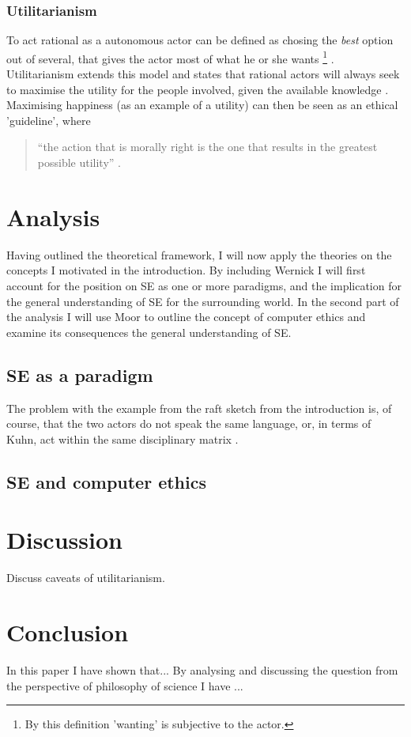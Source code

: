 \documentclass{article}
\begin{document}
\subsubsection{Utilitarianism}
To act rational as a autonomous actor can be defined as chosing the \textit{best} option out of several, that gives the actor most of what he or she wants \footnote{By this definition 'wanting' is subjective to the actor.} \citep[p. 232]{Gilje:2007}. Utilitarianism extends this model and states that rational actors will always seek to maximise the utility for the people involved, given the available knowledge \citep[p. 232]{Holm:2014, Gilje:2007}. Maximising happiness (as an example of a utility) can then be seen as an ethical 'guideline', where
\begin{quote}
``the action that is morally right is the one that results in the greatest possible utility'' \citep[p. 207]{Holm:2014}.
\end{quote}


\section{Analysis}
Having outlined the theoretical framework, I will now apply the theories on the concepts I motivated in the introduction. By including Wernick I will first account for the position on SE as one or more paradigms, and the implication for the general understanding of SE for the surrounding world.
In the second part of the analysis I will use Moor to outline the concept of computer ethics and examine its consequences the general understanding of SE.

\subsection{SE as a paradigm}
The problem with the example from the raft sketch from the introduction is, of course, that the two actors do not speak the same language, or, in terms of Kuhn, act within the same disciplinary matrix \citep{Holm:2014}.

\subsection{SE and computer ethics}

\section{Discussion} \label{Discussion}
Discuss caveats of utilitarianism.

\section{Conclusion}
In this paper I have shown that...
By analysing and discussing the question from the perspective
of philosophy of science I have ...


\end{document}
